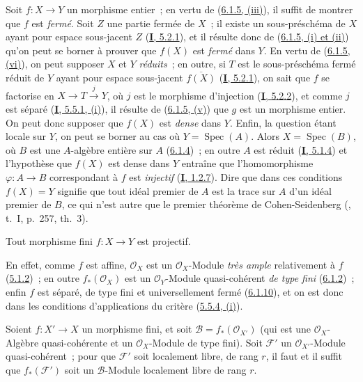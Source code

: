 Soit $f:X\to Y$ un morphisme entier~; en vertu de
(\hyperref[II.6.1.5-fr]{6.1.5, (iii)}), il suffit de montrer que $f$ est
\emph{fermé}. Soit $Z$ une partie fermée de $X$~; il existe un sous-préschéma de $X$
ayant
pour espace sous-jacent $Z$ (\hyperref[I.5.2.1-fr]{\textbf{I}, 5.2.1}), et il résulte
donc de (\hyperref[II.6.1.5-fr]{6.1.5, (i) et (ii)}) qu'on peut se borner à
prouver que $f(X)$ est \emph{fermé} dans $Y$. En vertu de
(\hyperref[II.6.1.5-fr]{6.1.5, (vi)}), on peut supposer $X$ et $Y$ \emph{réduits}~;
en outre, si $T$ est le sous-préschéma fermé réduit de $Y$ ayant pour espace
sous-jacent $\overline{f(X)}$ (\hyperref[I.5.2.1-fr]{\textbf{I}, 5.2.1}), on sait que
$f$ se factorise en $X\to T\xrightarrow{j}Y$, où $j$ est le
morphisme d'injection (\hyperref[I.5.2.2-fr]{\textbf{I}, 5.2.2}), et comme $j$ est
séparé (\hyperref[I.5.5.1-fr]{\textbf{I}, 5.5.1, (i)}), il résulte de
(\hyperref[II.6.1.5-fr]{6.1.5, (v)}) que $g$ est un morphisme entier. On peut
donc supposer que $f(X)$ est \emph{dense} dans $Y$. Enfin, la question étant locale
sur $Y$, on peut se borner au cas où $Y=\operatorname{Spec}(A)$. Alors
$X=\operatorname{Spec}(B)$, où $B$ est une $A$-algèbre entière sur $A$
(\hyperref[II.6.1.4-fr]{6.1.4})~; en outre $A$ est réduit
(\hyperref[I.5.1.4-fr]{\textbf{I}, 5.1.4}) et l'hypothèse que $f(X)$ est dense dans
$Y$ entraîne que l'homomorphisme $\varphi:A\to B$ correspondant à $f$ est
\emph{injectif} (\hyperref[I.1.2.7-fr]{\textbf{I}, 1.2.7}). Dire que dans ces conditions
$f(X)=Y$ signifie que tout idéal premier de $A$ est la trace sur $A$ d'un
idéal premier de $B$, ce qui n'est autre que le premier théorème de
Cohen-Seidenberg (\cite{I-13}, t.~I, p.~257, th.~3).

\begin{corollary}[6.1.11]
\label{II.6.1.11-fr}
Tout morphisme fini $f:X\to Y$ est projectif.
\end{corollary}

En effet, comme $f$ est affine, $\mathcal{O}_X$ est un
$\mathcal{O}_X$-Module \emph{très ample} relativement à $f$
(\hyperref[II.5.1.2-fr]{5.1.2})~; en outre $f_*(\mathcal{O}_X)$ est un
$\mathcal{O}_Y$-Module quasi-cohérent \emph{de type fini}
(\hyperref[II.6.1.2-fr]{6.1.2})~; enfin $f$ est séparé, de type fini et
universellement fermé (\hyperref[II.6.1.10-fr]{6.1.10}), et on est donc dans
les conditions d'applications du critère
(\hyperref[II.5.5.4-fr]{5.5.4, (i)}).

\begin{proposition}[6.1.12]
\label{II.6.1.12-fr}
Soient $f:X'\to X$ un morphisme fini, et soit
$\mathcal{B}=f_*(\mathcal{O}_{X'})$ (qui est une $\mathcal{O}_X$-Algèbre
quasi-cohérente et un $\mathcal{O}_X$-Module de type fini). Soit
$\mathcal{F}'$ un $\mathcal{O}_{X'}$-Module quasi-cohérent~; pour que
$\mathcal{F}'$ soit localement libre, de rang $r$, il faut et il suffit que
$f_*(\mathcal{F}')$ soit un $\mathcal{B}$-Module localement libre de rang
$r$.
\end{proposition}

